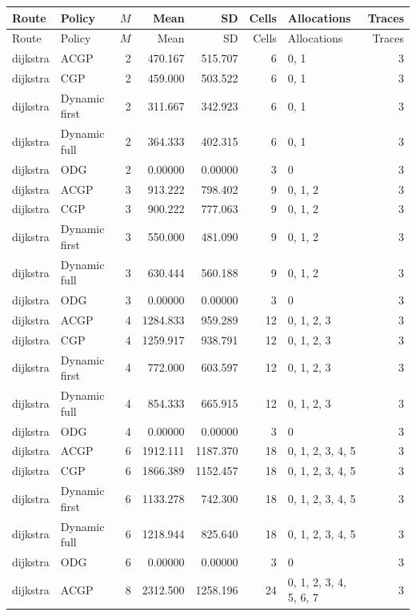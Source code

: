 \documentclass[10pt,a4paper]{article}
\begin{document}
\tiny\setlength{\tabcolsep}{2pt}\begin{longtable}{@{}p{23mm}p{29mm}rrrrp{36mm}r@{}}
\toprule Route & Policy & $M$ & Mean & SD & Cells & Allocations & Traces \\ \midrule\endfirsthead
\toprule Route & Policy & $M$ & Mean & SD & Cells & Allocations & Traces \\ \midrule\endhead
\bottomrule\endfoot
dijkstra & ACGP & 2 & 470.167 & 515.707 & 6 & 0, 1 & 3 \\
dijkstra & CGP & 2 & 459.000 & 503.522 & 6 & 0, 1 & 3 \\
dijkstra & Dynamic first & 2 & 311.667 & 342.923 & 6 & 0, 1 & 3 \\
dijkstra & Dynamic full & 2 & 364.333 & 402.315 & 6 & 0, 1 & 3 \\
dijkstra & ODG & 2 & 0.00000 & 0.00000 & 3 & 0 & 3 \\
dijkstra & ACGP & 3 & 913.222 & 798.402 & 9 & 0, 1, 2 & 3 \\
dijkstra & CGP & 3 & 900.222 & 777.063 & 9 & 0, 1, 2 & 3 \\
dijkstra & Dynamic first & 3 & 550.000 & 481.090 & 9 & 0, 1, 2 & 3 \\
dijkstra & Dynamic full & 3 & 630.444 & 560.188 & 9 & 0, 1, 2 & 3 \\
dijkstra & ODG & 3 & 0.00000 & 0.00000 & 3 & 0 & 3 \\
dijkstra & ACGP & 4 & 1284.833 & 959.289 & 12 & 0, 1, 2, 3 & 3 \\
dijkstra & CGP & 4 & 1259.917 & 938.791 & 12 & 0, 1, 2, 3 & 3 \\
dijkstra & Dynamic first & 4 & 772.000 & 603.597 & 12 & 0, 1, 2, 3 & 3 \\
dijkstra & Dynamic full & 4 & 854.333 & 665.915 & 12 & 0, 1, 2, 3 & 3 \\
dijkstra & ODG & 4 & 0.00000 & 0.00000 & 3 & 0 & 3 \\
dijkstra & ACGP & 6 & 1912.111 & 1187.370 & 18 & 0, 1, 2, 3, 4, 5 & 3 \\
dijkstra & CGP & 6 & 1866.389 & 1152.457 & 18 & 0, 1, 2, 3, 4, 5 & 3 \\
dijkstra & Dynamic first & 6 & 1133.278 & 742.300 & 18 & 0, 1, 2, 3, 4, 5 & 3 \\
dijkstra & Dynamic full & 6 & 1218.944 & 825.640 & 18 & 0, 1, 2, 3, 4, 5 & 3 \\
dijkstra & ODG & 6 & 0.00000 & 0.00000 & 3 & 0 & 3 \\
dijkstra & ACGP & 8 & 2312.500 & 1258.196 & 24 & 0, 1, 2, 3, 4, 5, 6, 7 & 3 \\

\end{longtable}
\end{document}
